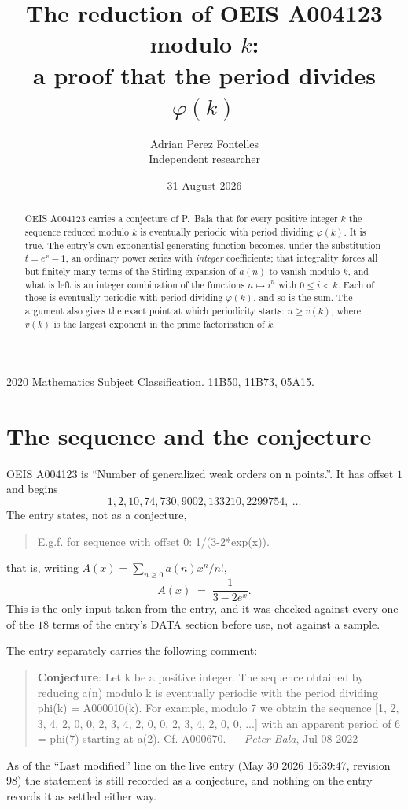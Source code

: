 \documentclass[11pt,a4paper]{article}
\title{The reduction of OEIS A004123 modulo $k$:\\ a proof that the period divides
$\varphi(k)$}
\author{Adrian Perez Fontelles\\ \small Independent researcher}
\date{31 August 2026}
\theoremstyle{plain}
\theoremstyle{definition}
\begin{document}
\maketitle

\begin{abstract}
OEIS A004123 carries a conjecture of P.~Bala that for every positive integer $k$ the
sequence reduced modulo $k$ is eventually periodic with period dividing $\varphi(k)$.
It is true. The entry's own exponential generating function becomes, under the
substitution $t=e^{x}-1$, an ordinary power series with \emph{integer} coefficients;
that integrality forces all but finitely many terms of the Stirling expansion of $a(n)$
to vanish modulo $k$, and what is left is an integer combination of the functions
$n\mapsto i^{n}$ with $0\le i<k$. Each of those is eventually periodic with period
dividing $\varphi(k)$, and so is the sum. The argument also gives the exact point at
which periodicity starts: $n\ge v(k)$, where $v(k)$ is the largest exponent in the
prime factorisation of $k$.
\end{abstract}

\noindent\small 2020 Mathematics Subject Classification. 11B50, 11B73, 05A15.\normalsize

\section{The sequence and the conjecture}

OEIS A004123 is ``Number of generalized weak orders on n points.''. It has offset $1$ and begins
\[
1, 2, 10, 74, 730, 9002, 133210, 2299754,\ \dots
\]
The entry states, not as a conjecture,
\begin{quote}\small
E.g.f. for sequence with offset 0: 1/(3-2*exp(x)).
\end{quote}
that is, writing $A(x)=\sum_{n\ge 0}a(n)x^{n}/n!$,
\begin{equation}\label{eq:egf}
A(x)\;=\;\frac{1}{3-2e^{x}}.
\end{equation}
This is the only input taken from the entry, and it was checked against every one of the
$18$ terms of the entry's DATA section before use, not against a sample.

The entry separately carries the following comment:
\begin{quote}\small
\textbf{Conjecture}: Let k be a positive integer. The sequence obtained by reducing a(n) modulo k is eventually periodic with the period dividing phi(k) = A000010(k). For example, modulo 7 we obtain the sequence [1, 2, 3, 4, 2, 0, 0, 2, 3, 4, 2, 0, 0, 2, 3, 4, 2, 0, 0, ...] with an apparent period of 6 = phi(7) starting at a(2). Cf. A000670. --- \emph{Peter Bala}, Jul 08 2022
\end{quote}
As of the ``Last modified'' line on the live entry (May 30 2026 16:39:47, revision
98) the statement is still recorded as a conjecture, and nothing on the entry
records it as settled either way.
\end{document}
